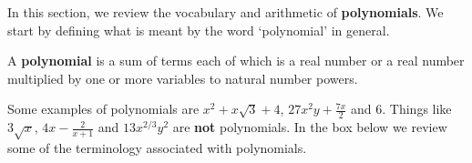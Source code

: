 

\setcounter{footnote}{0}

\label{AppPolyArith}

In this section, we review the vocabulary and arithmetic of \textbf{polynomials}. We start by defining what is meant by the word `polynomial' in general.  

\medskip

\colorbox{ResultColor}{\bbm

\begin{defn}[Polynomial]  A \textbf{polynomial} is a sum of terms each of which is a real number or a real number multiplied by one or more variables to natural number powers. 
\end{defn}

\ebm}

\medskip

Some examples of polynomials are $x^2 + x\sqrt{3} + 4$, $27x^2y + \frac{7x}{2}$ and $6$. Things like $3\sqrt{x}$, $4x - \frac{2}{x+1}$ and $13x^{2/3}y^{2}$ are \textbf{not} polynomials. In the box below we review some of the terminology associated with polynomials.

\medskip

